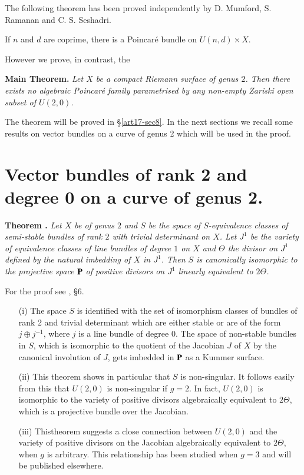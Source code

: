 The following theorem has been proved independently by D. Mumford, S. Ramanan and C. S. Seshadri.

\begin{theorem*}
If $n$ and $d$ are coprime, there is a Poincar\'e bundle on $U(n,d)\times X$.
\end{theorem*}

However we prove, in contrast, the 

\noindent
{\bf Main Theorem.}
{\em Let $X$ be a compact Riemann surface of genus $2$. Then there exists no algebraic Poincar\'e family parametrised by any non-empty Zariski open subset of $U(2,0)$.}
\smallskip

The theorem will be proved in \S\ref{art17-sec8}. In the next sections we recall some results on vector bundles on a curve of genus 2 which will be used in the proof.

\section{Vector bundles of rank 2 and degree 0 on a curve of genus 2.}\label{art17-sec4}

\medskip
\noindent
{\bf Theorem .\label{art17-thm4.1}}
{\em Let $X$ be of genus $2$ and $S$ be the space of $S$-equivalence classes of semi-stable bundles of rank $2$ with trivial determinant on $X$. Let $J^{1}$ be the variety of equivalence classes of line bundles of degree $1$ on $X$ and $\Theta$ the divisor on $J^{1}$ defined by the natural imbedding of $X$ in $J^{1}$. Then $S$ is canonically isomorphic to the projective space $\mathbf{P}$ of positive divisors on $J^{1}$ linearly equivalent to $2\Theta$.}
\smallskip

For the proof see \cite{art17-key3}, \S6.

\begin{remarks*}
\begin{itemize}
\item[(i)] The space $S$ is identified with the set of isomorphism classes of bundles of rank 2 and trivial determinant which are either stable or are of the form $j\oplus j^{-1}$, where $j$ is a line bundle of degree $0$. The space of non-stable bundles in $S$, which is isomorphic to the quotient of the Jacobian $J$ of $X$ by the canonical involution of $J$, gets imbedded in $\mathbf{P}$ as a Kummer surface.

\item[(ii)] This theorem shows in particular that $S$ is non-singular. It follows easily from this that $U(2,0)$ is non-singular if $g=2$. In fact, $U(2,0)$ is isomorphic to the variety of positive divisors algebraically equivalent to $2\Theta$, which is a projective bundle over the Jacobian.

\item[(iii)] This\pageoriginale theorem suggests a close connection between $U(2,0)$ and the variety of positive divisors on the Jacobian algebraically equivalent to $2\Theta$, when $g$ is arbitrary. This relationship has been studied when $g=3$ and will be published elsewhere.
\end{itemize}
\end{remarks*}

